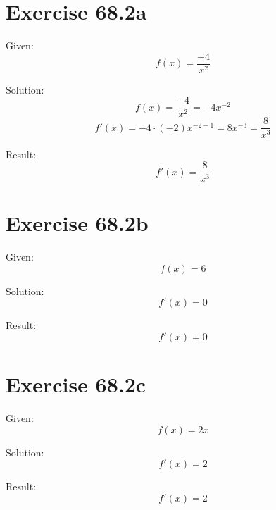 \documentclass[a4paper, 10pt]{scrartcl}
\begin{document}
\section{Exercise 68.2a}

Given:
\[f(x) = \frac{-4}{x^{2}}\]

Solution:
\[f(x) = \frac{-4}{x^{2}} = -4x^{-2}\]
\[f'(x) = -4\cdot(-2)x^{-2 - 1} = 8x^{-3} = \frac{8}{x^{3}}\]

Result:
\[f'(x) = \frac{8}{x^{3}}\]

\section{Exercise 68.2b}

Given:
\[f(x) = 6\]

Solution:
\[f'(x) = 0\]

Result:
\[f'(x) = 0\]

\section{Exercise 68.2c}

Given:
\[f(x) = 2x\]

Solution:
\[f'(x) = 2\]

Result:
\[f'(x) = 2\]
\end{document}
